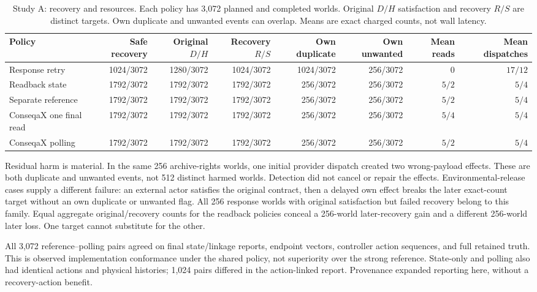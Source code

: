 \begin{table}[t]
\caption{Study A: recovery and resources. Each policy has 3,072 planned and completed worlds. Original $D/H$ satisfaction and recovery $R/S$ are distinct targets. Own duplicate and unwanted events can overlap. Means are exact charged counts, not wall latency.}
\label{tab:recovery-outcomes}
\centering\small
\setlength{\tabcolsep}{3.5pt}
\begin{tabular}{lrrrrrrr}
\toprule
Policy & Safe recovery & Original $D/H$ & Recovery $R/S$ & Own duplicate & Own unwanted & Mean reads & Mean dispatches \\
\midrule
Response retry & 1024/3072 & 1280/3072 & 1024/3072 & 1024/3072 & 256/3072 & 0 & $17/12$ \\
Readback state & 1792/3072 & 1792/3072 & 1792/3072 & 256/3072 & 256/3072 & $5/2$ & $5/4$ \\
Separate reference & 1792/3072 & 1792/3072 & 1792/3072 & 256/3072 & 256/3072 & $5/2$ & $5/4$ \\
ConseqaX one final read & 1792/3072 & 1792/3072 & 1792/3072 & 256/3072 & 256/3072 & $5/4$ & $5/4$ \\
ConseqaX polling & 1792/3072 & 1792/3072 & 1792/3072 & 256/3072 & 256/3072 & $5/2$ & $5/4$ \\
\bottomrule
\end{tabular}
\end{table}

Residual harm is material. In the same 256 archive-rights worlds, one initial provider dispatch created two wrong-payload effects. These are both duplicate and unwanted events, not 512 distinct harmed worlds. Detection did not cancel or repair the effects. Environmental-release cases supply a different failure: an external actor satisfies the original contract, then a delayed own effect breaks the later exact-count target without an own duplicate or unwanted flag. All 256 response worlds with original satisfaction but failed recovery belong to this family. Equal aggregate original/recovery counts for the readback policies conceal a 256-world later-recovery gain and a different 256-world later loss. One target cannot substitute for the other.

All 3,072 reference--polling pairs agreed on final state/linkage reports, endpoint vectors, controller action sequences, and full retained truth. This is observed implementation conformance under the shared policy, not superiority over the strong reference. State-only and polling also had identical actions and physical histories; 1,024 pairs differed in the action-linked report. Provenance expanded reporting here, without a recovery-action benefit.


